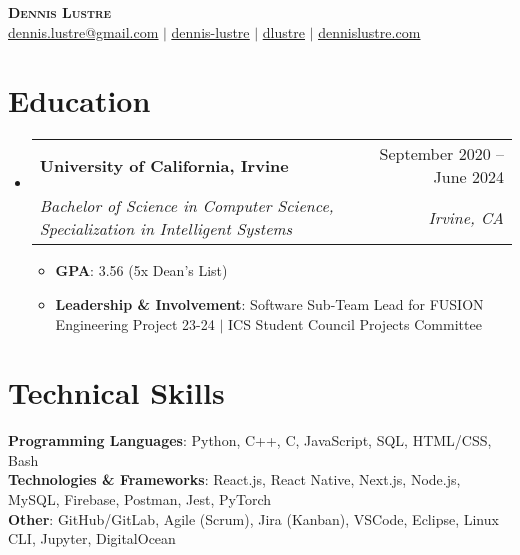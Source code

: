 \documentclass[letterpaper,11pt]{article}
\makeatletter
\newcommand{\resumeItem}[1]{
  \item\setstretch{.95}\small{
    {#1 \vspace{-2pt}}
  }
}
\newcommand{\resumeSubheading}[4]{
  \vspace{-2pt}\item
    \begin{tabular*}{0.97\textwidth}[t]{l@{\extracolsep{\fill}}r}
      \textbf{#1} & #2 \\
      \textit{\small#3} & \textit{\small #4} \\
    \end{tabular*}\vspace{-4.8pt}
}
\newcommand{\resumeSubHeadingListStart}{\begin{itemize}[leftmargin=0.15in, label={}]}
\newcommand{\resumeSubHeadingListEnd}{\end{itemize}}
\newcommand{\resumeItemListStart}{\begin{itemize}}
\newcommand{\resumeItemListEnd}{\end{itemize}\vspace{-5pt}}
\makeatother
\begin{document}
\begin{center}
    \textbf{\Huge \scshape Dennis Lustre} \\ \vspace{1pt}
    \faEnvelope{ }\href{mailto:dennis.lustre@gmail.com}{\uline{dennis.lustre@gmail.com}} $|$ 
    \faLinkedinSquare{ }\href{https://linkedin.com/in/dennis-lustre}{\uline{dennis-lustre}} $|$
    \faGithub{ }\href{https://github.com/dlustre}{\uline{dlustre}} $|$
    \faGlobe{ }\href{https://dennislustre.com}{\uline{dennislustre.com}}
\end{center}


\section{Education}
  \resumeSubHeadingListStart
    \resumeSubheading
      {University of California, Irvine}{September 2020 -- June 2024}
      {Bachelor of Science in Computer Science, Specialization in Intelligent Systems}{Irvine, CA}
    \resumeItemListStart
        \resumeItem{\textbf{GPA}: 3.56 (5x Dean's List)}
        \resumeItem{\textbf{Leadership \& Involvement}: Software Sub-Team Lead for FUSION Engineering Project 23-24 $|$ ICS Student Council Projects Committee}
    \resumeItemListEnd
  \resumeSubHeadingListEnd

\section{Technical Skills}
 \begin{itemize}[leftmargin=0.15in, label={}]
    \small{\item{
     \textbf{Programming Languages}{: Python, C++, C, JavaScript, SQL, HTML/CSS, Bash} \\
     \textbf{Technologies \& Frameworks}{: React.js, React Native, Next.js, Node.js, MySQL, Firebase, Postman, Jest, PyTorch} \\
     \textbf{Other}{: GitHub/GitLab, Agile (Scrum), Jira (Kanban), VSCode, Eclipse, Linux CLI, Jupyter, DigitalOcean} \\
    }}
 \end{itemize}
 
\end{document}
